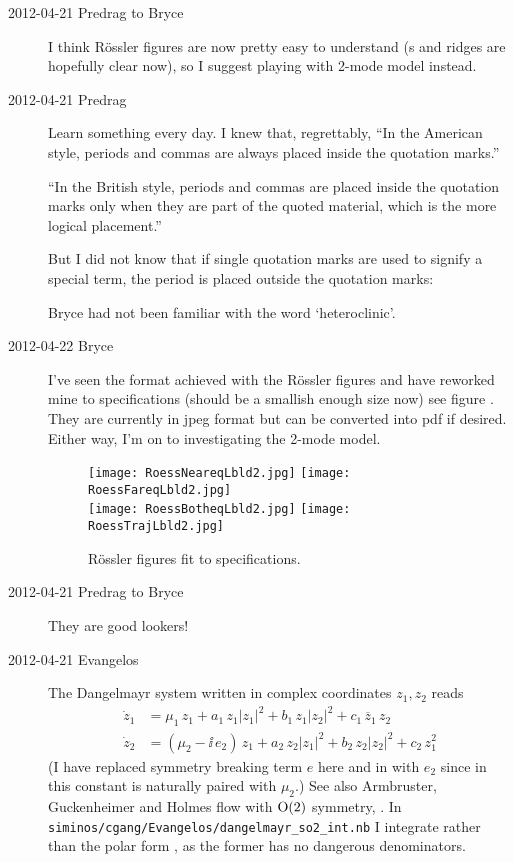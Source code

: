 \begin{description}
\item[2012-04-21 Predrag to Bryce] I think R\"ossler figures are now
pretty easy to understand (\poincBord s and ridges are hopefully clear
now), so I suggest playing with 2-mode model instead.

\item[2012-04-21 Predrag] Learn something every day. I knew that,
regrettably, ``In the American style, periods and commas are always
placed inside the quotation marks.''

``In the British style, periods and commas are placed
inside the quotation marks only when they are part of the quoted
material, which is the more logical placement.''

But I did not know that if single quotation marks are used to signify a
special term, the period is placed outside the quotation marks:

    Bryce had not been familiar with the word `heteroclinic'.

\item[2012-04-22 Bryce] I've seen the format achieved with the R\"ossler
figures and have reworked mine to specifications (should be a smallish
enough size now) see figure . They are currently in
jpeg format but can be converted into pdf if desired. Either way, I'm on
to investigating the 2-mode model.

\begin{figure}
\centering
\texttt{[image: RoessNeareqLbld2.jpg]}
\texttt{[image: RoessFareqLbld2.jpg]} \\
\texttt{[image: RoessBotheqLbld2.jpg]}
\texttt{[image: RoessTrajLbld2.jpg]}
\caption{R\"ossler figures fit to specifications. \label{fig:newRoss}}
\end{figure}

\item[2012-04-21 Predrag to Bryce] They are good lookers!

\item[2012-04-21 Evangelos] The Dangelmayr system written in complex
coordinates $z_1,z_2$ reads
\begin{subequations}\label{eq:DangSO2}
\begin{align}
  \dot{z}_1 &= \mu_1\,z_1+a_1\,z_1|z_1|^2+b_1\,z_1|z_2|^2+c_1\,\overline{z}_1\,z_2\,\\
  \dot{z}_2 &= (\mu_2-\ii\, e_2)\,z_1+a_2\,z_2|z_1|^2+b_2\,z_2|z_2|^2+c_2\,z_1^2
\end{align}
\end{subequations}
(I have replaced symmetry breaking term $e$ here and in 
with $e_2$ since in this constant is naturally paired with $\mu_2$.)
See also Armbruster, Guckenheimer and Holmes flow with
$\textrm{O}(2)$ symmetry, .
In \texttt{siminos/cgang/Evangelos/dangelmayr\_so2\_int.nb}
I integrate  rather than the polar form ,
as the former has no dangerous denominators.


\end{description}
